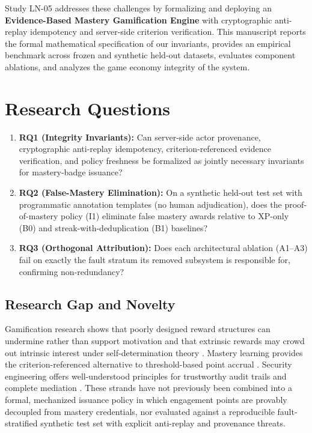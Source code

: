 \documentclass[11pt,a4paper]{article}
\begin{document}
Study LN-05 addresses these challenges by formalizing and deploying an \textbf{Evidence-Based Mastery Gamification Engine} with cryptographic anti-replay idempotency and server-side criterion verification. This manuscript reports the formal mathematical specification of our invariants, provides an empirical benchmark across frozen and synthetic held-out datasets, evaluates component ablations, and analyzes the game economy integrity of the system.

\section{Research Questions}

\begin{enumerate}[label=\textbf{RQ\arabic*}, leftmargin=2.4em]
    \item \textbf{RQ1 (Integrity Invariants):} Can server-side actor provenance, cryptographic anti-replay idempotency, criterion-referenced evidence verification, and policy freshness be formalized as jointly necessary invariants for mastery-badge issuance?
    \item \textbf{RQ2 (False-Mastery Elimination):} On a synthetic held-out test set with programmatic annotation templates (no human adjudication), does the proof-of-mastery policy (I1) eliminate false mastery awards relative to XP-only (B0) and streak-with-deduplication (B1) baselines?
    \item \textbf{RQ3 (Orthogonal Attribution):} Does each architectural ablation (A1--A3) fail on exactly the fault stratum its removed subsystem is responsible for, confirming non-redundancy?
\end{enumerate}

\subsection{Research Gap and Novelty}

Gamification research shows that poorly designed reward structures can undermine rather than support motivation \cite{deterding2011game, hamari2014does} and that extrinsic rewards may crowd out intrinsic interest under self-determination theory \cite{ryan2000self}. Mastery learning provides the criterion-referenced alternative to threshold-based point accrual \cite{bloom1968mastery}. Security engineering offers well-understood principles for trustworthy audit trails and complete mediation \cite{saltzer1975protection}. These strands have not previously been combined into a formal, mechanized issuance policy in which engagement points are provably decoupled from mastery credentials, nor evaluated against a reproducible fault-stratified synthetic test set with explicit anti-replay and provenance threats.
\end{document}
